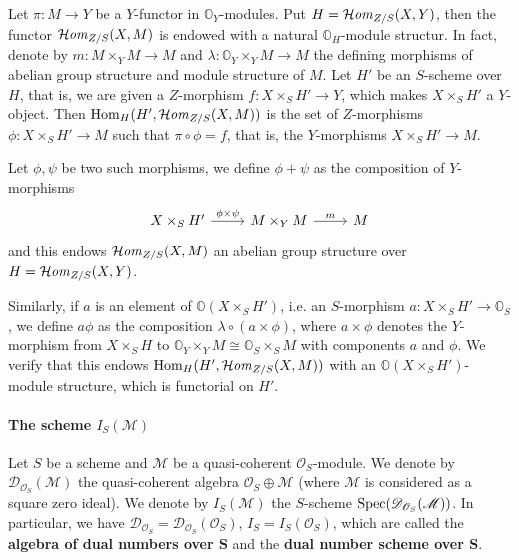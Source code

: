\begin{remark}\label{category of presheaf functor Hom module structure}
Let $\pi:M\to Y$ be a $Y$-functor in $\mathbb{O}_Y$-modules. Put $H=\operatorname{\mathcal{H}\hspace*{-0.4pt}\textit{om}\hspace{0.5pt}}_{Z/S}(X,Y)$, then the functor $\operatorname{\mathcal{H}\hspace*{-0.4pt}\textit{om}\hspace{0.5pt}}_{Z/S}(X,M)$ is endowed with a natural $\mathbb{O}_H$-module structur. In fact, denote by $m:M\times_YM\to M$ and $\lambda:\mathbb{O}_Y\times_YM\to M$ the defining morphisms of abelian group structure and module structure of $M$. Let $H'$ be an $S$-scheme over $H$, that is, we are given a $Z$-morphism $f:X\times_SH'\to Y$, which makes $X\times_SH'$ a $Y$-object. Then $\mathrm{Hom}_H(H',\operatorname{\mathcal{H}\hspace*{-0.4pt}\textit{om}\hspace{0.5pt}}_{Z/S}(X,M))$ is the set of $Z$-morphisms $\phi:X\times_SH'\to M$ such that $\pi\circ\phi=f$, that is, the $Y$-morphisms $X\times_SH'\to M$.\par
Let $\phi,\psi$ be two such morphisms, we define $\phi+\psi$ as the composition of $Y$-morphisms
\[\begin{tikzcd}
X\times_SH'\ar[r,"\phi\times\psi"]&M\times_YM\ar[r,"m"]&M
\end{tikzcd}\]
and this endows $\operatorname{\mathcal{H}\hspace*{-0.4pt}\textit{om}\hspace{0.5pt}}_{Z/S}(X,M)$ an abelian group structure over $H=\operatorname{\mathcal{H}\hspace*{-0.4pt}\textit{om}\hspace{0.5pt}}_{Z/S}(X,Y)$.\par
Similarly, if $a$ is an element of $\mathbb{O}(X\times_SH')$, i.e. an $S$-morphism $a:X\times_SH'\to\mathbb{O}_S$, we define $a\phi$ as the composition $\lambda\circ(a\times\phi)$, where $a\times\phi$ denotes the $Y$-morphism from $X\times_SH$ to $\mathbb{O}_Y\times_YM\cong\mathbb{O}_S\times_SM$ with components $a$ and $\phi$. We verify that this endows $\mathrm{Hom}_H(H',\operatorname{\mathcal{H}\hspace*{-0.4pt}\textit{om}\hspace{0.5pt}}_{Z/S}(X,M))$ with an $\mathbb{O}(X\times_SH')$-module structure, which is functorial on $H'$.
\end{remark}

\paragraph{The scheme \texorpdfstring{$I_S(\mathscr{M})$}{I}}\label{scheme tangent bundle I_S paragraph}
\begin{definition}
Let $S$ be a scheme and $\mathscr{M}$ be a quasi-coherent $\mathscr{O}_S$-module. We denote by $\mathscr{D}_{\mathscr{O}_S}(\mathscr{M})$ the quasi-coherent algebra $\mathscr{O}_S\oplus\mathscr{M}$ (where $\mathscr{M}$ is considered as a square zero ideal). We denote by $I_S(\mathscr{M})$ the $S$-scheme $\mathrm{Spec}(\mathscr{D}_{\mathscr{O}_S}(\mathscr{M}))$. In particular, we have $\mathscr{D}_{\mathscr{O}_S}=\mathscr{D}_{\mathscr{O}_S}(\mathscr{O}_S)$, $I_S=I_S(\mathscr{O}_S)$, which are called the \textbf{algebra of dual numbers over $\bm{S}$} and the \textbf{dual number scheme over $\bm{S}$}.
\end{definition}

